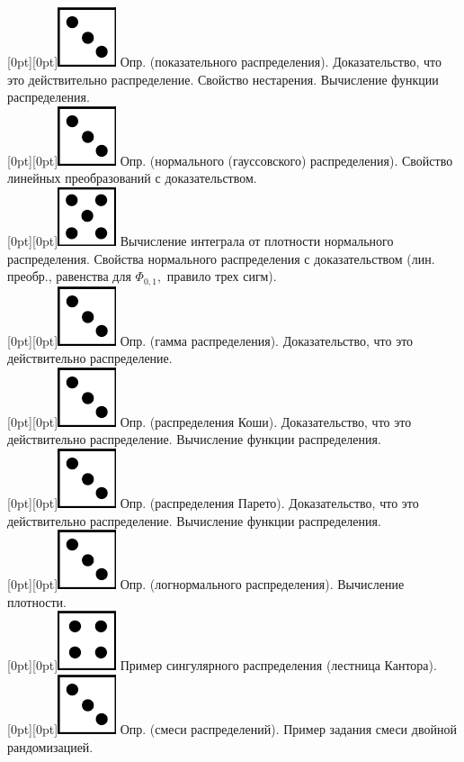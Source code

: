 \documentclass[10pt]{amsart}
\begin{document}
\begin{enumerate}
\begin{enumerate}
 \raisebox{-1pt}[0pt][0pt]{\includegraphics[width=0.02\linewidth]{3.png}}  Опр. (показательного распределения). Доказательство, что это действительно распределение. Свойство нестарения. Вычисление функции распределения. \\  
 \raisebox{-1pt}[0pt][0pt]{\includegraphics[width=0.02\linewidth]{3.png}}  Опр. (нормального (гауссовского) распределения). Свойство линейных преобразований с доказательством. \\
 \raisebox{-1pt}[0pt][0pt]{\includegraphics[width=0.02\linewidth]{5.png}} Вычисление интеграла от плотности нормального распределения.  Свойства нормального распределения с доказательством (лин. преобр., равенства для $\Phi_{0,1},$ правило трех сигм). \\
 \raisebox{-1pt}[0pt][0pt]{\includegraphics[width=0.02\linewidth]{3.png}} Опр. (гамма распределения). Доказательство, что это действительно распределение. \\
 \raisebox{-1pt}[0pt][0pt]{\includegraphics[width=0.02\linewidth]{3.png}} Опр. (распределения Коши). Доказательство, что это действительно распределение. Вычисление функции распределения. \\
 \raisebox{-1pt}[0pt][0pt]{\includegraphics[width=0.02\linewidth]{3.png}} Опр. (распределения Парето). Доказательство, что это действительно распределение. Вычисление функции распределения. \\
 \raisebox{-1pt}[0pt][0pt]{\includegraphics[width=0.02\linewidth]{3.png}} Опр. (логнормального распределения). Вычисление плотности. \\
 \raisebox{-1pt}[0pt][0pt]{\includegraphics[width=0.02\linewidth]{4.png}}   Пример сингулярного распределения (лестница Кантора). \\
 \raisebox{-1pt}[0pt][0pt]{\includegraphics[width=0.02\linewidth]{3.png}}  Опр. (смеси распределений). Пример задания смеси двойной рандомизацией. \\


\end{enumerate}
\end{enumerate}
\end{document}
